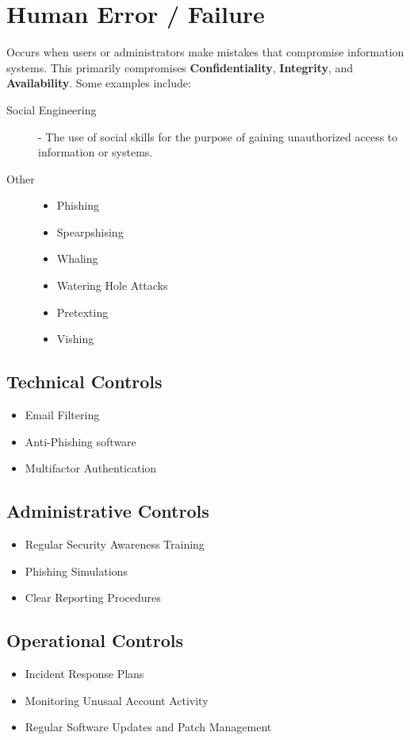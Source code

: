 \documentclass[12pt letter]{report}
\begin{document}
\section{Human Error / Failure}
Occurs when users or administrators make mistakes that compromise
information systems. This primarily compromises \textbf{Confidentiality},
\textbf{Integrity}, and \textbf{Availability}. Some examples include:
\begin{description}
  \item[Social Engineering]  - The use of social skills for the purpose
    of gaining unauthorized access to information or systems.
  \item[Other]
    \begin{itemize}
      \item Phishing
      \item Spearpshising
      \item Whaling
      \item Watering Hole Attacks
      \item Pretexting
      \item Vishing
    \end{itemize}
\end{description}

\subsection{Technical Controls}
\begin{itemize}
  \item Email Filtering
  \item Anti-Phishing software
  \item Multifactor Authentication
\end{itemize}

\subsection{Administrative Controls}
\begin{itemize}
  \item Regular Security Awareness Training
  \item Phishing Simulations
  \item Clear Reporting Procedures
\end{itemize}

\subsection{Operational Controls}
\begin{itemize}
  \item Incident Response Plans
  \item Monitoring Unusaal Account Activity
  \item Regular Software Updates and Patch Management
\end{itemize}
\end{document}
